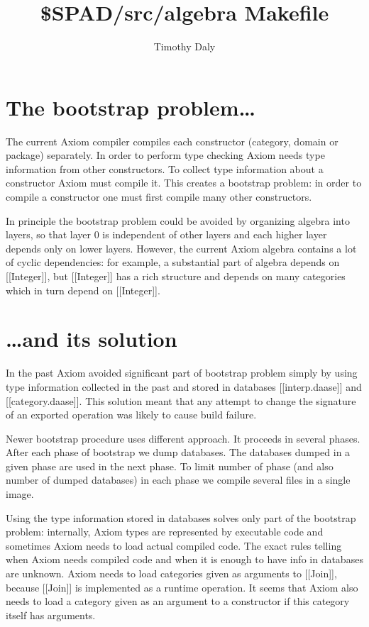 \documentclass{article}
\title{\$SPAD/src/algebra Makefile}
\author{Timothy Daly}
\begin{document}
\maketitle

\begin{abstract}
\end{abstract}
\eject

\tableofcontents
\eject


\section{The bootstrap problem\dots}

The current Axiom compiler compiles each constructor (category, domain
or package) separately.  In order to perform type checking Axiom
needs type information from other constructors.  To collect
type information about a constructor Axiom must compile it.
This creates a bootstrap problem: in order to compile a constructor
one must first compile many other constructors.

In principle the bootstrap problem could be avoided by organizing algebra
into layers, so that layer $0$ is independent of other layers and
each higher layer depends only on lower layers.  However, the current
Axiom algebra contains a lot of cyclic dependencies: for example, a substantial
part of algebra depends on [[Integer]], but [[Integer]] has a rich structure
and depends on many categories which in turn depend on [[Integer]].

\section{\dots and its solution}


In the past Axiom avoided significant part of bootstrap problem
simply by using type information collected in the past
and stored in databases [[interp.daase]] and [[category.daase]].
This solution meant that any attempt to change the signature of an exported
operation was likely to cause build failure.

Newer bootstrap procedure uses different approach.  It proceeds
in several phases.  After each phase of bootstrap we dump databases.
The databases dumped in a given phase are used in the next phase.
To limit number of phase (and also number of dumped databases)
in each phase we compile several files in a single image.

Using the type information stored in databases solves only part of
the bootstrap problem: internally, Axiom types are represented by
executable code and sometimes Axiom needs to load actual compiled
code.  The exact rules telling when Axiom needs compiled code
and when it is enough to have info in databases are unknown.
Axiom needs to load categories given as arguments to [[Join]],
because [[Join]] is implemented as a runtime operation.  It
seems that Axiom also needs to load a category given as an argument
to a constructor if this category itself has arguments.
\end{document}
